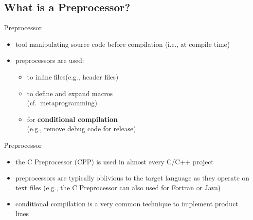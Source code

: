 \subsection{What is a Preprocessor?}
\begin{frame}{\myframetitle{}}
	\begin{mycolumns}
		\begin{definition}{Preprocessor}
			\begin{itemize}
				\item tool manipulating source code before compilation (i.e., at compile time)
				\item preprocessors are used:
					\begin{itemize}
						\item to inline files\hfill(e.g., header files)
						\item to define and expand macros\\\hfill(cf.\ metaprogramming)
						\item for \textbf{conditional compilation}\\\hfill(e.g., remove debug code for release)
					\end{itemize}
			\end{itemize}
		\end{definition}
	\mynextcolumn
		\begin{note}{Preprocessor}
			\begin{itemize}
				\item the C Preprocessor (CPP) is used in almost every C/C++ project
				\item preprocessors are typically oblivious to the target language as they operate on text files (e.g., the C Preprocessor can also used for Fortran or Java)
				\item conditional compilation is a very common technique to implement product lines
			\end{itemize}
		\end{note}
	\end{mycolumns}
\end{frame}


